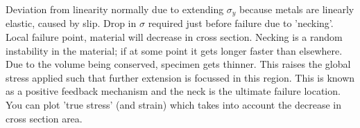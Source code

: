Deviation from linearity normally due to extending \(\sigma_y\) because metals are linearly elastic, caused by slip. Drop in \(\sigma\) required just before failure due to 'necking'. Local failure point, material will decrease in cross section. Necking is a random instability in the material; if at some point it gets longer faster than elsewhere. Due to the volume being conserved, specimen gets thinner. This raises the global stress applied such that further extension is focussed in this region. This is known as a positive feedback mechanism and the neck is the ultimate failure location. You can plot 'true stress' (and strain) which takes into account the decrease in cross section area.
